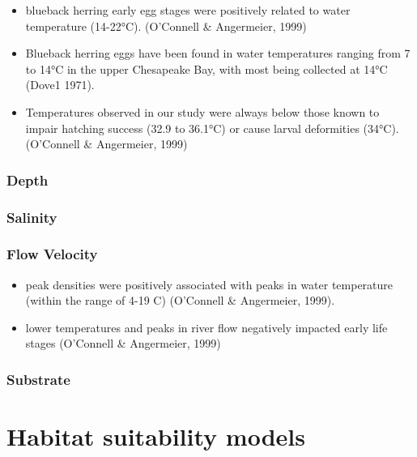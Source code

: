 \documentclass[
]{book}
\providecommand{\tightlist}{%
  \setlength{\itemsep}{0pt}\setlength{\parskip}{0pt}}
\begin{document}
\begin{itemize}
\tightlist
\item
  blueback herring early egg stages were positively related to water temperature (14-22°C). (O'Connell \& Angermeier, 1999)
\item
  Blueback herring eggs have been found in water temperatures ranging from 7 to 14°C in the upper Chesapeake Bay, with most being collected at 14°C (Dove1 1971).
\item
  Temperatures observed in our study were always below those known to impair hatching success (32.9 to 36.1°C) or cause larval deformities (34°C). (O'Connell \& Angermeier, 1999)
\end{itemize}

\hypertarget{depth-8}{%
\subsubsection{Depth}\label{depth-8}}

\hypertarget{salinity-8}{%
\subsubsection{Salinity}\label{salinity-8}}

\hypertarget{flow-velocity-8}{%
\subsubsection{Flow Velocity}\label{flow-velocity-8}}

\begin{itemize}
\item
  peak densities were positively associated with peaks in water temperature (within the range of 4-19 C) (O'Connell \& Angermeier, 1999).
\item
  lower temperatures and peaks in river flow negatively impacted early life stages (O'Connell \& Angermeier, 1999)
\end{itemize}

\hypertarget{substrate-8}{%
\subsubsection{Substrate}\label{substrate-8}}

\hypertarget{habitat-suitability-models-1}{%
\section{Habitat suitability models}\label{habitat-suitability-models-1}}
\end{document}
